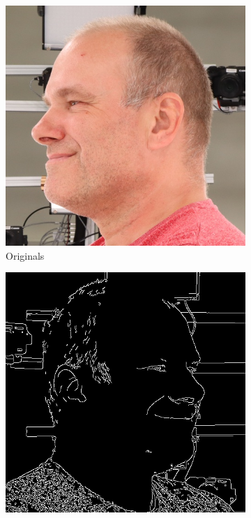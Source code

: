 \begin{figure}[ht]
\begin{subfigure}{0.18\linewidth}
        \includegraphics[width=\textwidth]{Figures/resized_images/0-C-5-1-5386_212530_574.JPG}
		\caption{Originals}
	\end{subfigure}
    \begin{subfigure}{0.18\linewidth}
        \includegraphics[width=\textwidth]{Figures/failed/controlnet/canny/0-4-5-1-5648_230239_266_canny.png}

\end{subfigure}
\end{figure}
